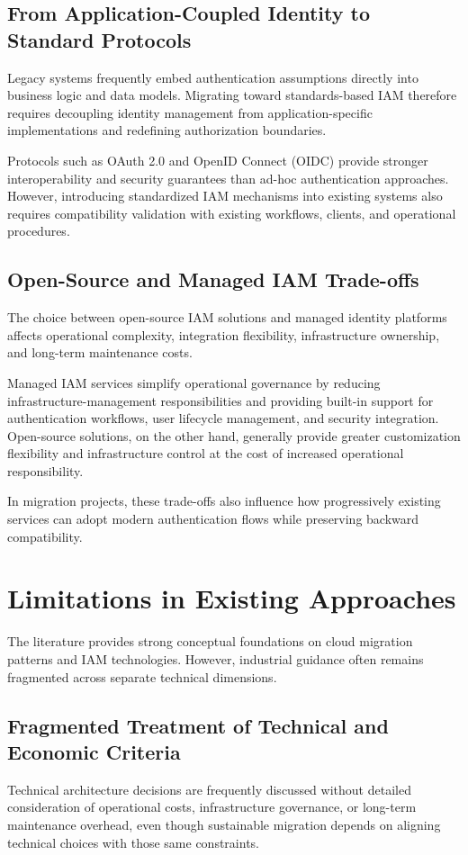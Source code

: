 \subsection{From Application-Coupled Identity to Standard Protocols}
Legacy systems frequently embed authentication assumptions directly into business logic and data models. Migrating toward standards-based IAM therefore requires decoupling identity management from application-specific implementations and redefining authorization boundaries.

Protocols such as OAuth 2.0 and OpenID Connect (OIDC) provide stronger interoperability and security guarantees than ad-hoc authentication approaches. However, introducing standardized IAM mechanisms into existing systems also requires compatibility validation with existing workflows, clients, and operational procedures.

\subsection{Open-Source and Managed IAM Trade-offs}
The choice between open-source IAM solutions and managed identity platforms affects operational complexity, integration flexibility, infrastructure ownership, and long-term maintenance costs.

Managed IAM services simplify operational governance by reducing infrastructure-management responsibilities and providing built-in support for authentication workflows, user lifecycle management, and security integration. Open-source solutions, on the other hand, generally provide greater customization flexibility and infrastructure control at the cost of increased operational responsibility.

In migration projects, these trade-offs also influence how progressively existing services can adopt modern authentication flows while preserving backward compatibility.

\section{Limitations in Existing Approaches}
The literature provides strong conceptual foundations on cloud migration patterns and IAM technologies. However, industrial guidance often remains fragmented across separate technical dimensions.

\subsection{Fragmented Treatment of Technical and Economic Criteria}
Technical architecture decisions are frequently discussed without detailed consideration of operational costs, infrastructure governance, or long-term maintenance overhead, even though sustainable migration depends on aligning technical choices with those same constraints.

